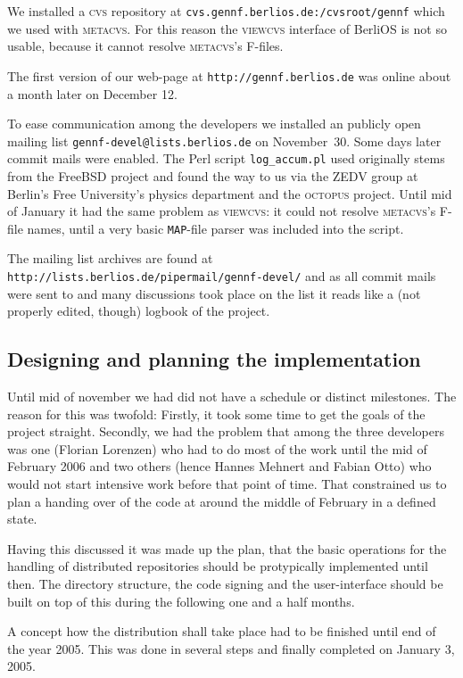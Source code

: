 \documentclass[fleqn, 10pt, a4paper]{report} \usepackage{amssymb}
\begin{document}
We installed a \textsc{cvs} repository at
\texttt{cvs.gennf.berlios.de:/cvsroot/gennf} which we used with
\textsc{metacvs}. For this reason the \textsc{viewcvs} interface of
BerliOS is not so usable, because it cannot resolve \textsc{metacvs}'s
F-files.

The first version of our web-page at \texttt{http://gennf.berlios.de}
was online about a month later on December 12.

To ease communication among the developers we installed an publicly
open mailing list \texttt{gennf-devel@lists.berlios.de} on
November~30. Some days later commit mails were enabled.  The Perl
script \texttt{log\_accum.pl} used originally stems from the FreeBSD
project and found the way to us via the ZEDV group at Berlin's Free
University's physics department and the \textsc{octopus} project.
Until mid of January it had the same problem as \textsc{viewcvs}: it
could not resolve \textsc{metacvs}'s F-file names, until a very basic
\texttt{MAP}-file parser was included into the script.

The mailing list archives are found at
\texttt{http://lists.berlios.de/pipermail/gennf-devel/} and as all
commit mails were sent to and many discussions took place on the list
it reads like a (not properly edited, though) logbook of the project.

\subsection{Designing and planning the implementation}

Until mid of november we had did not have a schedule or distinct
milestones. The reason for this was twofold: Firstly, it took some
time to get the goals of the project straight. Secondly, we had the
problem that among the three developers was one (Florian Lorenzen) who
had to do most of the work until the mid of February 2006 and two
others (hence Hannes Mehnert and Fabian Otto) who would not start
intensive work before that point of time. That constrained us to plan
a handing over of the code at around the middle of February in a
defined state.

Having this discussed it was made up the plan, that the basic
operations for the handling of distributed repositories should be
protypically implemented until then. The directory structure, the code
signing and the user-interface should be built on top of this during the
following one and a half months.

A concept how the distribution shall take place had to be finished
until end of the year 2005. This was done in several steps and finally
completed on January 3, 2005.
\end{document}
